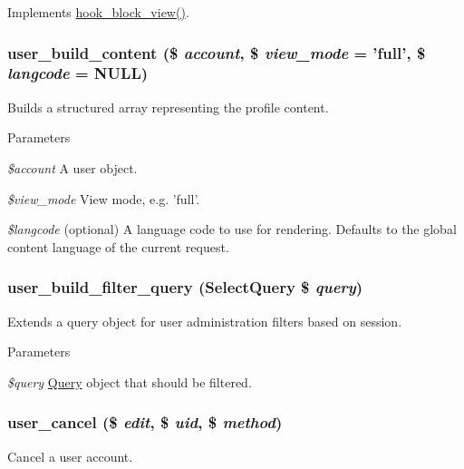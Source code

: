 \label{user_8module_ac06f7fc22561ebb4ad7130564bb7526e}
Implements \hyperlink{group__hooks_gaa14092a3e74cdc57aa295100cfd6860d}{hook\_\-block\_\-view()}. \hypertarget{user_8module_ab37696ec0ec393751b7cfb06146963f1}{
\subsubsection[{user\_\-build\_\-content}]{\setlength{\rightskip}{0pt plus 5cm}user\_\-build\_\-content (\$ {\em account}, \/  \$ {\em view\_\-mode} = {\ttfamily 'full'}, \/  \$ {\em langcode} = {\ttfamily NULL})}}
\label{user_8module_ab37696ec0ec393751b7cfb06146963f1}
Builds a structured array representing the profile content.


\begin{DoxyParams}{Parameters}
\item[{\em \$account}]A user object. \item[{\em \$view\_\-mode}]View mode, e.g. 'full'. \item[{\em \$langcode}](optional) A language code to use for rendering. Defaults to the global content language of the current request. \end{DoxyParams}
\hypertarget{user_8module_ae862ab5b636280ab3c4376eb2c00f049}{
\subsubsection[{user\_\-build\_\-filter\_\-query}]{\setlength{\rightskip}{0pt plus 5cm}user\_\-build\_\-filter\_\-query ({\bf SelectQuery} \$ {\em query})}}
\label{user_8module_ae862ab5b636280ab3c4376eb2c00f049}
Extends a query object for user administration filters based on session.


\begin{DoxyParams}{Parameters}
\item[{\em \$query}]\hyperlink{classQuery}{Query} object that should be filtered. \end{DoxyParams}
\hypertarget{user_8module_af6ef747e6353edaecc43f55dc85eff9e}{
\subsubsection[{user\_\-cancel}]{\setlength{\rightskip}{0pt plus 5cm}user\_\-cancel (\$ {\em edit}, \/  \$ {\em uid}, \/  \$ {\em method})}}
\label{user_8module_af6ef747e6353edaecc43f55dc85eff9e}
Cancel a user account.

